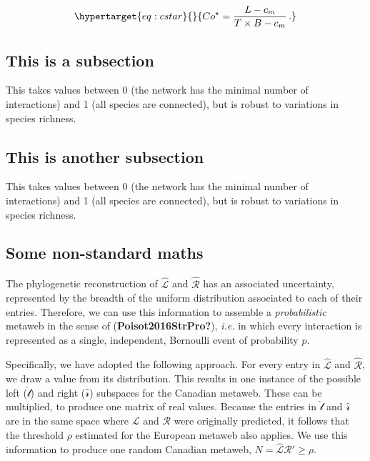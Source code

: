 \documentclass[11pt]{article}
\begin{document}
\begin{equation}\protect\hypertarget{eq:cstar}{}{Co^\star=\frac{L-c_m}{T\times B-c_m} \,.}\label{eq:cstar}\end{equation}

\hypertarget{this-is-a-subsection}{%
\subsection{This is a subsection}\label{this-is-a-subsection}}

This takes values between 0 (the network has the minimal number of
interactions) and 1 (all species are connected), but is robust to
variations in species richness.

\hypertarget{this-is-another-subsection}{%
\subsection{This is another
subsection}\label{this-is-another-subsection}}

This takes values between 0 (the network has the minimal number of
interactions) and 1 (all species are connected), but is robust to
variations in species richness.

\hypertarget{some-non-standard-maths}{%
\subsection{Some non-standard maths}\label{some-non-standard-maths}}

The phylogenetic reconstruction of \(\hat{\mathscr{L}}\) and
\(\hat{\mathscr{R}}\) has an associated uncertainty, represented by the
breadth of the uniform distribution associated to each of their entries.
Therefore, we can use this information to assemble a
\emph{probabilistic} metaweb in the sense of
(\textbf{Poisot2016StrPro?}), \emph{i.e.} in which every interaction is
represented as a single, independent, Bernoulli event of probability
\(p\).

Specifically, we have adopted the following approach. For every entry in
\(\hat{\mathscr{L}}\) and \(\hat{\mathscr{R}}\), we draw a value from
its distribution. This results in one instance of the possible left
(\(\hat{\mathscr{l}}\)) and right (\(\hat{\mathscr{r}}\)) subspaces for
the Canadian metaweb. These can be multiplied, to produce one matrix of
real values. Because the entries in \(\hat{\mathscr{l}}\) and
\(\hat{\mathscr{r}}\) are in the same space where \(\mathscr{L}\) and
\(\mathscr{R}\) were originally predicted, it follows that the threshold
\(\rho\) estimated for the European metaweb also applies. We use this
information to produce one random Canadian metaweb,
\(N = \hat{\mathscr{L}}\)\(\hat{\mathscr{R}}' \ge \rho\).
\end{document}
